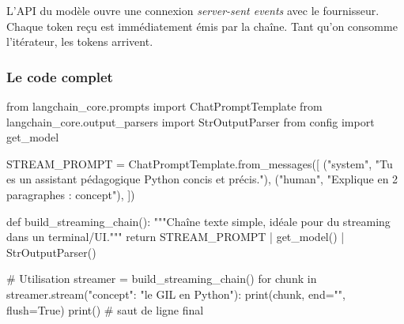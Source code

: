 \documentclass[11pt,a4paper]{article}
\begin{document}
\begin{center}
\end{center}

L'API du modèle ouvre une connexion \emph{server-sent events} avec le
fournisseur. Chaque token reçu est immédiatement émis par la chaîne. Tant
qu'on consomme l'itérateur, les tokens arrivent.

\subsubsection{Le code complet}

\begin{pythoncode}
from langchain_core.prompts import ChatPromptTemplate
from langchain_core.output_parsers import StrOutputParser
from config import get_model

STREAM_PROMPT = ChatPromptTemplate.from_messages([
    ("system", "Tu es un assistant pédagogique Python concis et précis."),
    ("human",  "Explique en 2 paragraphes : {concept}"),
])


def build_streaming_chain():
    """Chaîne texte simple, idéale pour du streaming dans un terminal/UI."""
    return STREAM_PROMPT | get_model() | StrOutputParser()


# Utilisation
streamer = build_streaming_chain()
for chunk in streamer.stream({"concept": "le GIL en Python"}):
    print(chunk, end="", flush=True)
print()  # saut de ligne final
\end{pythoncode}
\end{document}
